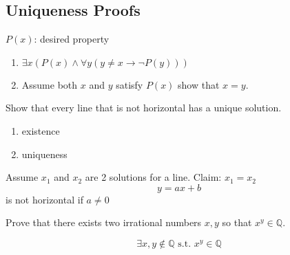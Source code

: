 \documentclass[letterpaper, 12pt]{article}
\newenvironment{proof}[1][Proof]{\begin{trivlist}
\item[\hskip \labelsep {\bfseries #1}]}{\end{trivlist}}
\newenvironment{example}[1][Example]{\begin{trivlist}
\item[\hskip \labelsep {\bfseries #1}]}{\end{trivlist}}
\newcommand{\then}{\rightarrow}
\begin{document}
    \subsection*{Uniqueness Proofs}
    $P(x)$: desired property
    \begin{enumerate}
        \item $\exists x (P(x) \wedge \forall y ( y \ne x \then \neg P(y)))$
        \item Assume both $x$ and $y$ satisfy $P(x)$ show that $x = y$.
    \end{enumerate}
    \begin{example}
        Show that every line that is not horizontal has a unique solution.
    \end{example}
    \begin{proof}
        \hfill
        \begin{enumerate}
            \item existence
            \item uniqueness
        \end{enumerate}
        Assume $x_1$ and $x_2$ are 2 solutions for a line. Claim: $x_1 = x_2$
        \[y = ax + b\]
        is not horizontal if $a \ne 0$ \\
    \end{proof}
    \begin{example}
        Prove that there exists two irrational numbers $x, y$ so that $x^y \in \mathbb{Q}$.
    \end{example}
    \begin{proof}
        \[\exists x, y \notin \mathbb{Q} \text{ s.t. } x^y \in \mathbb{Q}\]
    \end{proof}
\end{document}

